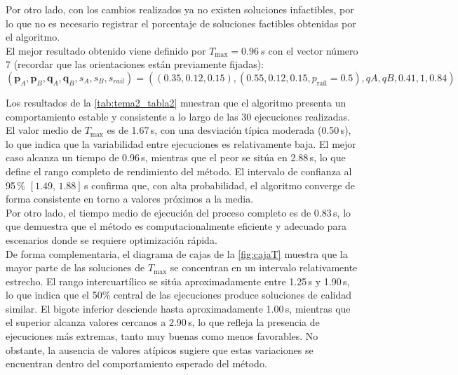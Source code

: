 Por otro lado, con los cambios realizados ya no existen soluciones infactibles, por lo que no es necesario
registrar el porcentaje de soluciones factibles obtenidas por el algoritmo.\\

El mejor resultado obtenido viene definido por $T_{\max} = 0.96\, s$ con 
el vector número 7 (recordar que las orientaciones están previamente fijadas): 
\[(\mathbf{p}_A,\mathbf{p}_B,
\mathbf{q}_A,\mathbf{q}_B,
s_A,s_B,s_{rail}) = 
((0.35, 0.12, 0.15), (0.55, 0.12, 0.15, p_{\text{raíl}} = 0.5), qA, qB, 0.41, 1, 0.84)\]

Los resultados de la \autoref{tab:tema2_tabla2} muestran que el algoritmo presenta un comportamiento
estable y consistente a lo largo de las 30 ejecuciones realizadas. El valor medio de $T_{\max}$ es
de 1.67\,s, con una desviación típica moderada (0.50\,s), lo que indica que la variabilidad entre
ejecuciones es relativamente baja. El mejor caso alcanza un tiempo de 0.96\,s, mientras que el peor
se sitúa en 2.88\,s, lo que define el rango completo de rendimiento del método. El intervalo de 
confianza al 95\,\% $[1.49,\,1.88]$\,s confirma que, con alta probabilidad, el algoritmo converge
de forma consistente en torno a valores próximos a la media. \\

Por otro lado, el tiempo medio de ejecución del proceso completo es de 0.83\,s, lo que demuestra
que el método es computacionalmente eficiente y adecuado para escenarios donde se requiere 
optimización rápida. \\

De forma complementaria, el diagrama de cajas de la \autoref{fig:cajaT} 
muestra que la mayor parte de las soluciones de $T_{\max}$ se concentran en un intervalo 
relativamente estrecho. El rango intercuartílico se sitúa aproximadamente entre 1.25\,s y 1.90\,s, 
lo que indica que el 50\% central de las ejecuciones produce soluciones de calidad similar.
El bigote inferior desciende hasta aproximadamente 1.00\,s, mientras que el superior alcanza
valores cercanos a 2.90\,s, lo que refleja la presencia de ejecuciones más extremas, tanto muy
buenas como menos favorables. No obstante, la ausencia de valores atípicos sugiere que
estas variaciones se encuentran dentro del comportamiento esperado del método.


